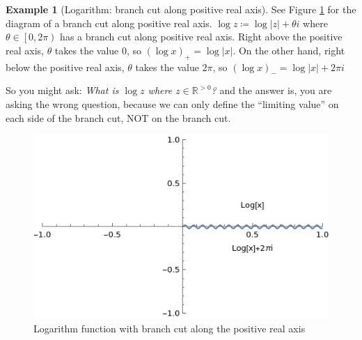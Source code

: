 \documentclass[a4paper, 12pt]{article}
\theoremstyle{definition}
\newtheorem{example}{Example}
\numberwithin{theorem}{section}
\numberwithin{definition}{section}
\numberwithin{exercise}{section}
\numberwithin{remark}{section}
\numberwithin{figure}{section}
\numberwithin{example}{section}
\newcommand{\R}{\mathbb{R}}
\begin{document}
\begin{example}[Logarithm: branch cut along positive real axis]
    See Figure \ref{fig: Log Positive Real} for the diagram of a branch cut along positive real axis.
    $\log z \coloneqq \log |z| + \theta i$ where $\theta \in \left[ 0, 2\pi \right)$ has a branch cut along positive real axis.
    Right above the positive real axis, $\theta$ takes the value 0, so $\left(\log x\right)_{+} = \log |x|$.
    On the other hand, right below the positive real axis, $\theta$ takes the value $2\pi$, so $\left( \log x \right)_{-} = \log |x| + 2\pi i$

    So you might ask: \textit{What is $\log z$ where $z \in \R^{>0}$?} and the answer is,
    you are asking the wrong question, because we can only define the ``limiting value'' on each side of the branch cut,
    NOT on the branch cut.
    \begin{figure}[tbp]
        \centering
        \includegraphics{logpositivereal}
        \caption{Logarithm function with branch cut along the positive real axis}
        \label{fig: Log Positive Real}
    \end{figure}
\end{example}
\end{document}
